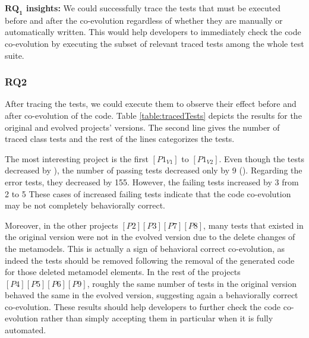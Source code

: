 \begin{tcolorbox}[boxsep=-2pt]
	\textbf{$\boldsymbol{RQ_1}$ insights:}
	We could successfully trace the tests that must be executed before and after the co-evolution regardless of whether they are manually or automatically written. This would help developers to immediately check the code co-evolution by executing the subset of relevant traced tests among the whole test suite. 
\end{tcolorbox}

\subsubsection{RQ2}

After tracing the tests, we could execute them to observe their effect before and after co-evolution of the code. Table \ref{table:tracedTests} depicts the results for the original and evolved projects' versions. The second line gives the number of traced class tests and the rest of the lines categorizes the tests.  

The most interesting project is the first $[P1_{V1}]$ to $[P1_{V2}]$. Even though the tests decreased by ), the number of passing tests decreased only by 9 (). Regarding the error tests, they decreased by 155. However, the failing tests increased by 3 from 2 to 5 These cases of increased failing tests indicate that the code co-evolution may be not completely behaviorally correct. 

Moreover, in the other projects $[P2][P3][P7][P8]$, many tests that existed in the original version were not in the evolved version due to the delete changes of the metamodels. This is actually a sign of behavioral correct co-evolution, as indeed the tests should be removed following the removal of the generated code for those deleted metamodel elements. 
\red{}In the rest of the projects $[P4][P5][P6][P9]$, roughly the same number of tests in the original version behaved the same in the evolved version, suggesting again a behaviorally correct co-evolution.
These results should help developers to further check the code co-evolution rather than simply accepting them in particular when it is fully automated. 


